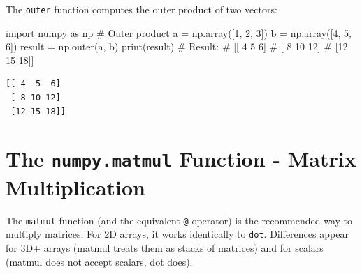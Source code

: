 \documentclass[
  english,
  letterpaper,
  DIV=11,
  numbers=noendperiod]{scrreprt}
\newenvironment{Shaded}{\begin{snugshade}}{\end{snugshade}}
\newcommand{\BuiltInTok}[1]{\textcolor[rgb]{0.00,0.23,0.31}{#1}}
\newcommand{\CommentTok}[1]{\textcolor[rgb]{0.37,0.37,0.37}{#1}}
\newcommand{\DecValTok}[1]{\textcolor[rgb]{0.68,0.00,0.00}{#1}}
\newcommand{\ImportTok}[1]{\textcolor[rgb]{0.00,0.46,0.62}{#1}}
\newcommand{\NormalTok}[1]{\textcolor[rgb]{0.00,0.23,0.31}{#1}}
\newcommand{\OperatorTok}[1]{\textcolor[rgb]{0.37,0.37,0.37}{#1}}
\begin{document}
The \texttt{outer} function computes the outer product of two vectors:

\begin{Shaded}
\begin{Highlighting}[]
\ImportTok{import}\NormalTok{ numpy }\ImportTok{as}\NormalTok{ np}
\CommentTok{\# Outer product}
\NormalTok{a }\OperatorTok{=}\NormalTok{ np.array([}\DecValTok{1}\NormalTok{, }\DecValTok{2}\NormalTok{, }\DecValTok{3}\NormalTok{])}
\NormalTok{b }\OperatorTok{=}\NormalTok{ np.array([}\DecValTok{4}\NormalTok{, }\DecValTok{5}\NormalTok{, }\DecValTok{6}\NormalTok{])}
\NormalTok{result }\OperatorTok{=}\NormalTok{ np.outer(a, b)}
\BuiltInTok{print}\NormalTok{(result)}
\CommentTok{\# Result:}
\CommentTok{\# [[ 4  5  6]}
\CommentTok{\#  [ 8 10 12]}
\CommentTok{\#  [12 15 18]]}
\end{Highlighting}
\end{Shaded}

\begin{verbatim}
[[ 4  5  6]
 [ 8 10 12]
 [12 15 18]]
\end{verbatim}

\section{\texorpdfstring{The \texttt{numpy.matmul} Function - Matrix
Multiplication}{The numpy.matmul Function - Matrix Multiplication}}\label{the-numpy.matmul-function---matrix-multiplication}

The \texttt{matmul} function (and the equivalent \texttt{@} operator) is
the recommended way to multiply matrices. For 2D arrays, it works
identically to \texttt{dot}. Differences appear for 3D+ arrays (matmul
treats them as stacks of matrices) and for scalars (matmul does not
accept scalars, dot does).
\end{document}

